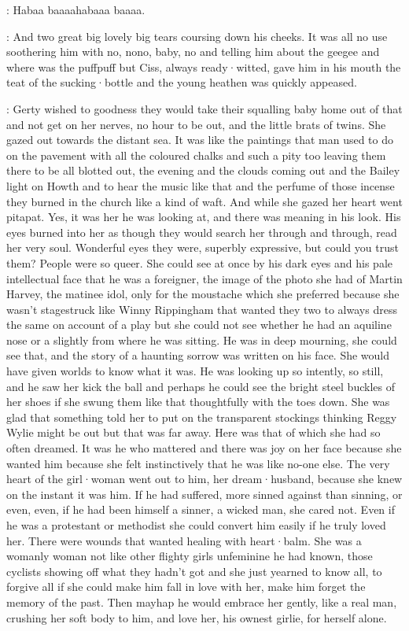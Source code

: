 \baby:
Habaa baaaahabaaa baaaa.

:
And two great big lovely big tears coursing down his cheeks.
It was all no
use soothering him with no,
nono, baby, no
and telling him about the
geegee and where was the puffpuff but Ciss,
always ready·witted,
gave him
in his mouth the teat of the sucking·bottle and the young heathen was
quickly appeased.

:
Gerty wished to goodness they would take their squalling baby home out of
that and not get on her nerves,
no hour to be out,
and the little brats
of twins.
She gazed out towards the distant sea.
It was like the paintings
that man used to do on the pavement with all the coloured chalks and such
a pity too leaving them there to be all blotted out,
the evening and the
clouds coming out and the Bailey light on Howth and to hear the music like
that and the perfume of those incense they burned in the church
like a kind of waft.
And while she gazed her heart went pitapat.
Yes,
it was her
he was looking at,
and there was meaning in his look.
His eyes burned into
her as though they would search her through and through,
read her very
soul.
Wonderful eyes they were,
superbly expressive,
but could you trust
them?
People were so queer.
She could see at once by his dark eyes and his
pale intellectual face that he was a foreigner,
the image of the photo she
had of Martin Harvey,
the matinee idol,
only for the moustache which she
preferred because she wasn't stagestruck like Winny Rippingham that
wanted they two to always dress the same on account of a play but she
could not see
whether he had an aquiline nose or a slightly 
from where he was sitting.
He was in deep mourning,
she could see that,
and the
story of a haunting sorrow was written on his face.
She would have given
worlds to know what it was.
He was looking up so intently,
so still,
and
he saw her kick the ball and perhaps he could see the bright steel buckles
of her shoes if she swung them like that thoughtfully with the toes down.
She was glad that something told her to put on the transparent stockings
thinking Reggy Wylie might be out but that was far away.
Here was that of
which she had so often dreamed.
It was he who mattered and there was joy
on her face because she wanted him because she felt instinctively that he
was like no-one else.
The very heart of the girl·woman went out to him,
her dream·husband,
because she knew on the instant it was him.
If he had
suffered,
more sinned against than sinning,
or even,
even,
if he had been
himself a sinner,
a wicked man,
she cared not.
Even if he was a protestant
or methodist she could convert him easily if he truly loved her.
There
were wounds that wanted healing with heart·balm.
She was a womanly woman
not like other flighty girls unfeminine he had known,
those cyclists
showing off what they hadn't got and she just yearned to know all,
to forgive all if she could make him fall in love with her,
make him forget
the memory of the past.
Then mayhap he would embrace her gently,
like a real man,
crushing her soft body to him,
and love her,
his ownest girlie,
for herself alone.

